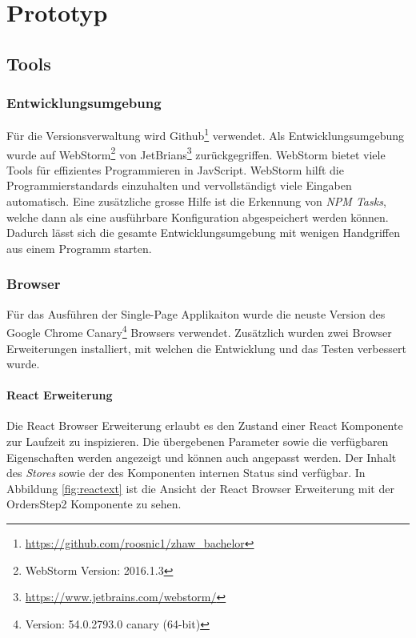 \chapter{Prototyp}
\label{sec:prototyp}


\section{Tools}
\subsection{Entwicklungsumgebung}
Für die Versionsverwaltung wird Github\footnote{\url{https://github.com/roosnic1/zhaw_bachelor}} verwendet. Als Entwicklungsumgebung wurde auf WebStorm\footnote{WebStorm Version: 2016.1.3} von JetBrians\footnote{\url{https://www.jetbrains.com/webstorm/}} zurückgegriffen. WebStorm bietet viele Tools für effizientes Programmieren in JavScript. WebStorm hilft die Programmierstandards einzuhalten und vervollständigt viele Eingaben automatisch. Eine zusätzliche grosse Hilfe ist die Erkennung von \textit{NPM Tasks}, welche dann als eine ausführbare Konfiguration abgespeichert werden können. Dadurch lässt sich die gesamte Entwicklungsumgebung mit wenigen Handgriffen aus einem Programm starten.

\subsection{Browser}
Für das Ausführen der Single-Page Applikaiton wurde die neuste Version des Google Chrome Canary\footnote{Version: 54.0.2793.0 canary (64-bit)} Browsers verwendet. Zusätzlich wurden zwei Browser Erweiterungen installiert, mit welchen die Entwicklung und das Testen verbessert wurde.

\subsubsection{React Erweiterung}
Die React Browser Erweiterung erlaubt es den Zustand einer React Komponente zur Laufzeit zu inspizieren. Die übergebenen Parameter sowie die verfügbaren Eigenschaften werden angezeigt und können auch angepasst werden. Der Inhalt des \textit{Stores} sowie der des Komponenten internen Status sind verfügbar. In Abbildung \ref{fig:reactext} ist die Ansicht der React Browser Erweiterung mit der OrdersStep2 Komponente zu sehen.

